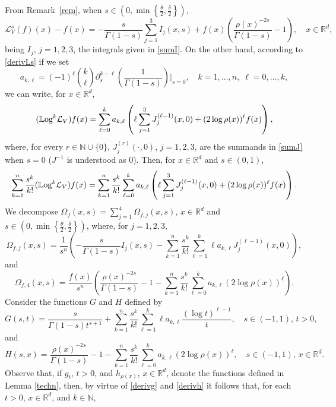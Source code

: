 \documentclass[10pt, a4paper, reqno]{amsart}
\theoremstyle{definition}
\theoremstyle{remark}
\numberwithin{equation}{section}
\begin{document}
From Remark~\ref{rem}, when $s\in (0,\min\left\{\tfrac{\theta}{2},\tfrac{\delta}{2}\right\})$, 
\[
\mathcal L_V^s(f)(x)-f(x)=-\frac{s}{\Gamma (1-s)}\sum_{j=1}^3I_j(x,s)+f(x)\left(\frac{\rho (x)^{-2s}}{\Gamma (1-s)}-1\right),\quad x\in \mathbb R^d,
\]
being $I_j$, $j=1,2,3$, the integrals given in \eqref{sumI}. On the other hand, according to \eqref{derivLs} if we set 
\begin{equation}\label{akl}
a_{k,\ell}=(-1)^\ell \binom{k}{\ell}\partial _s^{k-\ell}\left(\frac{1}{\Gamma (1-s)}\right)\Big|_{s=0},\quad k=1,\ldots, n,\;\ell =0,\ldots, k,
\end{equation}
we can write, for $x\in \mathbb R^d$,
\[(\mathbb{L}\textup{og}^k\mathcal L_V)f(x)=\sum_{\ell =0}^ka_{k,\ell}\left(\ell \sum_{j=1}^3J_j^{(\ell -1)}(x,0)+(2\log \rho (x))^\ell f(x)\right),\]
where, for every $r\in \mathbb N\cup\{0\}$, $J_j^{(r)}(\cdot,0)$, $j=1,2,3$, are the summands in \eqref{sumJ} when $s=0$ ($J^{-1}$ is understood as $0$). 
Then, for $x\in \mathbb R^d$ and $s\in (0,1)$,
\[
\sum_{k=1}^n\frac{s^k}{k!}(\mathbb{L}\textup{og}^k\mathcal L_V)f(x)=\sum_{k=1}^n\frac{s^k}{k!}\sum_{\ell =0}^ka_{k,\ell}\left(\ell \sum_{j=1}^3J_j^{(\ell -1)}(x,0)+(2\log \rho (x))^\ell f(x)\right).
\]
We decompose $\Omega_f(x,s)=\sum_{j=1}^4\Omega_{f,j}(x,s)$, $x\in \mathbb R^d$ and $s\in (0,\min\left\{\tfrac{\theta}{2},\tfrac{\delta}{2}\right\})$, where, for $j=1,2,3$, 
\[
\Omega_{f,j}(x,s)=\frac{1}{s^n}\left(-\frac{s}{\Gamma (1-s)}I_j(x,s)-\sum_{k=1}^n\frac{s^k}{k!}\sum_{\ell =1}^k\ell a_{k,\ell}J_j^{(\ell -1)}(x,0)\right),
\]
and
\[
\Omega_{f,4}(x,s)=\frac{f(x)}{s^n}\left(\frac{\rho (x)^{-2s}}{\Gamma (1-s)}-1-\sum_{k=1}^n\frac{s^k}{k!}\sum_{\ell =0}
^ka_{k,\ell}(2\log \rho (x))^\ell \right).
\]
Consider the functions $G$ and $H$ defined by
\begin{equation}\label{functionG}
G(s,t)=\frac{s}{\Gamma (1-s)t^{s+1}}+\sum_{k=1}^n\frac{s^k}{k!}\sum_{\ell =1}^k\ell a_{k,\ell}\frac{(\log t)^{\ell -1}}{t},\quad s\in (-1,1),\,t>0, 
\end{equation}
and
\begin{equation}\label{functionH}
H(s,x)=\frac{\rho (x)^{-2s}}{\Gamma (1-s)}-1-\sum_{k=1}^n\frac{s^k}{k!}\sum_{\ell =0}^ka_{k,\ell}(2\log \rho (x))^\ell,\quad s\in (-1,1),\,x\in \mathbb R^d.
\end{equation}
Observe that, if $g_t$, $t>0$, and $h_{\rho (x)}$, $x\in \mathbb R^d$, denote the functions defined in Lemma \ref{techn}, then, by virtue of \eqref{derivg} and \eqref{derivh} it follows that, for each $t>0$, $x\in \mathbb R^d$, and $k\in \mathbb N$,  
\end{document}

